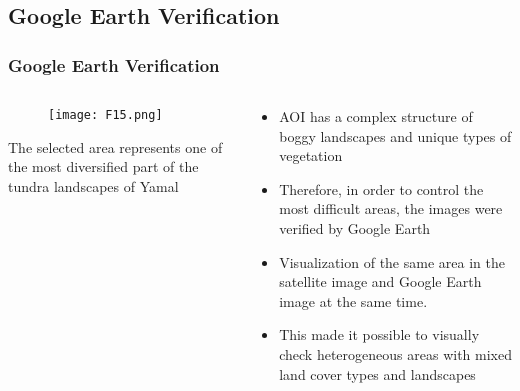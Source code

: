 \documentclass[pdflatex,compress,9pt,
	xcolor={dvipsnames,dvipsnames,svgnames,x11names,table},
	hyperref={colorlinks = true,breaklinks = true, urlcolor = NavyBlue, breaklinks = true}]{beamer}
\begin{document}
\subsection{Google Earth Verification}
\begin{frame}\frametitle{Google Earth Verification}
\begin{minipage}[0.4\textheight]{\textwidth}
\begin{columns}[T]
\begin{column}{0.5\textwidth}
\vspace{2em}
\begin{figure}[H]
	\centering
		\texttt{[image: F15.png]}
\end{figure}
The selected area represents one of the most diversified part of the tundra landscapes of Yamal
\end{column}
\begin{column}{0.5\textwidth}
\vspace{2em} 
\begin{itemize}
            \item AOI has a complex structure of boggy landscapes and unique types of vegetation
            \item Therefore, in order to control the most difficult areas, the images were verified by Google Earth
            \item Visualization of the same area in the satellite image and Google Earth image at the same time.
            \item This made it possible to visually check heterogeneous areas with mixed land cover types and landscapes
\end{itemize}
\end{column}
\end{columns}
\end{minipage}
\end{frame}
\end{document}
